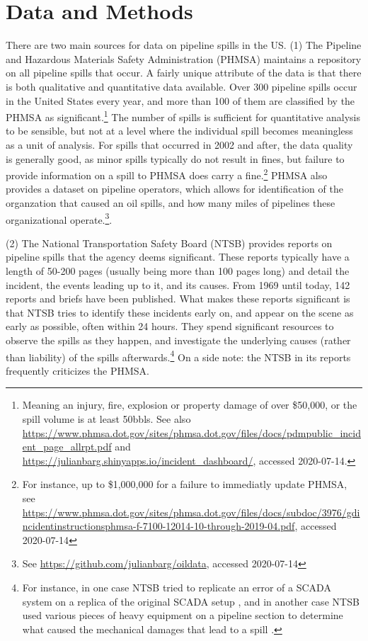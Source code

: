 \section{Data and Methods}

There are two main sources for data on pipeline spills in the US. (1) The Pipeline and Hazardous Materials Safety Administration (PHMSA) maintains a repository on all pipeline spills that occur. A fairly unique attribute of the data is that there is both qualitative and quantitative data available. Over 300 pipeline spills occur in the United States every year, and more than 100 of them are classified by the PHMSA as significant.\footnote{Meaning an injury, fire, explosion or property damage of over \$50,000, or the spill volume is at least 50bbls. See also \url{https://www.phmsa.dot.gov/sites/phmsa.dot.gov/files/docs/pdmpublic_incident_page_allrpt.pdf} and \url{https://julianbarg.shinyapps.io/incident_dashboard/}, accessed 2020-07-14.} The number of spills is sufficient for quantitative analysis to be sensible, but not at a level where the individual spill becomes meaningless as a unit of analysis. For spills that occurred in 2002 and after, the data quality is generally good, as minor spills typically do not result in fines, but failure to provide information on a spill to PHMSA does carry a fine.\footnote{For instance, up to \$1,000,000 for a failure to immediatly update PHMSA, see \url{https://www.phmsa.dot.gov/sites/phmsa.dot.gov/files/docs/subdoc/3976/gdincidentinstructionsphmsa-f-7100-12014-10-through-2019-04.pdf}, accessed 2020-07-14} PHMSA also provides a dataset on pipeline operators, which allows for identification of the organzation that caused an oil spills, and how many miles of pipelines these organizational operate.\footnote{See \url{https://github.com/julianbarg/oildata}, accessed 2020-07-14}.

(2) The National Transportation Safety Board (NTSB) provides reports on pipeline spills that the agency deems significant. These reports typically have a length of 50-200 pages (usually being more than 100 pages long) and detail the incident, the events leading up to it, and its causes. From 1969 until today, 142 reports and briefs have been published. What makes these reports significant is that NTSB tries to identify these incidents early on, and appear on the scene as early as possible, often within 24 hours. They spend significant resources to observe the spills as they happen, and investigate the underlying causes (rather than liability) of the spills afterwards.\footnote{For instance, in one case NTSB tried to replicate an error of a SCADA system on a replica of the original SCADA setup \citep{NTSB2002}, and in another case NTSB used various pieces of heavy equipment on a pipeline section to determine what caused the mechanical damages that lead to a spill \citep{NTSB1990}.} On a side note: the NTSB in its reports frequently criticizes the PHMSA.

